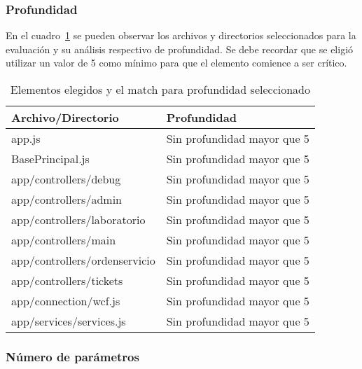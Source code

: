 \subsubsection{Profundidad}
En el cuadro~\ref{table:depth} se pueden observar los archivos y directorios 
seleccionados para la evaluación y su análisis respectivo de profundidad. Se 
debe recordar que se eligió utilizar un valor de 5 como mínimo para que el 
elemento comience a ser crítico.
\begin{table}
  \small
\centering
    \begin{tabular}{|l|l|}
    \hline
    \textbf{Archivo/Directorio}            & \textbf{Profundidad}                 \\ \hline
    app.js                        & Sin profundidad mayor que 5 \\ \hline
    BasePrincipal.js              & Sin profundidad mayor que 5 \\ \hline
    app/controllers/debug         & Sin profundidad mayor que 5 \\ \hline
    app/controllers/admin         & Sin profundidad mayor que 5 \\ \hline
    app/controllers/laboratorio   & Sin profundidad mayor que 5 \\ \hline
    app/controllers/main          & Sin profundidad mayor que 5 \\ \hline
    app/controllers/ordenservicio & Sin profundidad mayor que 5 \\ \hline
    app/controllers/tickets       & Sin profundidad mayor que 5 \\ \hline
    app/connection/wcf.js         & Sin profundidad mayor que 5 \\ \hline
    app/services/services.js      & Sin profundidad mayor que 5 \\ \hline
    \end{tabular}
    \caption{Elementos elegidos y el match para profundidad seleccionado}
    \label{table:depth}
\end{table}
\subsubsection{Número de parámetros}

